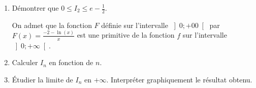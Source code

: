 \begin{enumerate}
     \begin{enumerate}[label=\alph*.]
          \item
          Démontrer que $0 \leqslant  I_{2} \leqslant  e-\frac{1}{2}$.
          \par
          On admet que la fonction $F$ définie sur l'intervalle $\left]0 ;+00 \right[$ par $F\left(x\right)=\frac{-2-\ln \left(x\right)}{x}$ est une primitive de la fonction $f$ sur l'intervalle $\left]0 ; +\infty \right[$.
          \item
          Calculer $I_{n}$ en fonction de $n$.
          \item
          Étudier la limite de $I_{n}$ en $+\infty $. Interpréter graphiquement le résultat obtenu.
     \end{enumerate}
\end{enumerate}
